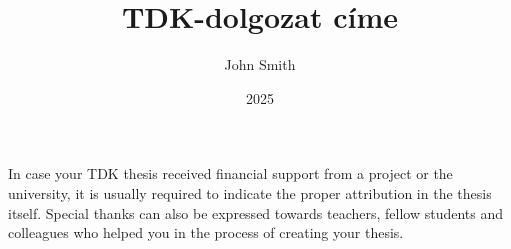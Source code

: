 \documentclass[
]{oeniktdk}[2024/04/26]
\title{TDK-dolgozat címe}
\date{2025}
\author{John Smith}
\affiliation{Assistant Lecturer}
\begin{document}


\makecover
\cleardoublepage
\maketitle

\tableofcontents
\cleardoublepage


\cleardoublepage


\cleardoublepage


\cleardoublepage


\cleardoublepage

\chapter*{\acklabel}
In case your TDK thesis received financial support from a project or the university, it is usually required to indicate the proper attribution in the thesis itself. Special thanks can also be expressed towards teachers, fellow students and colleagues who helped you in the process of creating your thesis.

\appendix

\cleardoublepage

{}
\printbibliography[title=\biblabel]
\cleardoublepage

{}
\listoffigures
\cleardoublepage

{}
\listoftables
\cleardoublepage

{}
\listofalgorithms
\cleardoublepage

{}
\lstlistoflistings
\cleardoublepage

\end{document}
